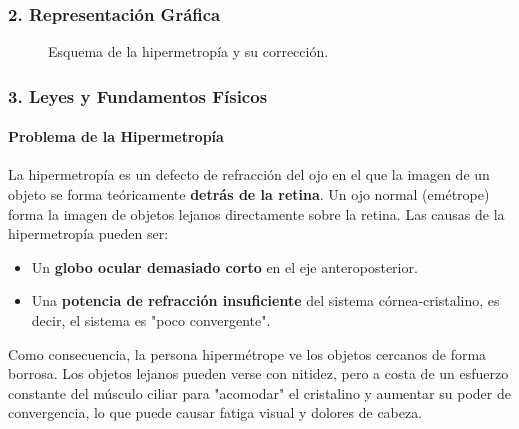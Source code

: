 \subsubsection*{2. Representación Gráfica}
\begin{figure}[H]
    \centering
    \hfill
    \caption{Esquema de la hipermetropía y su corrección.}
\end{figure}

\subsubsection*{3. Leyes y Fundamentos Físicos}
\paragraph{Problema de la Hipermetropía}
La hipermetropía es un defecto de refracción del ojo en el que la imagen de un objeto se forma teóricamente \textbf{detrás de la retina}. Un ojo normal (emétrope) forma la imagen de objetos lejanos directamente sobre la retina. Las causas de la hipermetropía pueden ser:
\begin{itemize}
    \item Un \textbf{globo ocular demasiado corto} en el eje anteroposterior.
    \item Una \textbf{potencia de refracción insuficiente} del sistema córnea-cristalino, es decir, el sistema es "poco convergente".
\end{itemize}
Como consecuencia, la persona hipermétrope ve los objetos cercanos de forma borrosa. Los objetos lejanos pueden verse con nitidez, pero a costa de un esfuerzo constante del músculo ciliar para "acomodar" el cristalino y aumentar su poder de convergencia, lo que puede causar fatiga visual y dolores de cabeza.

